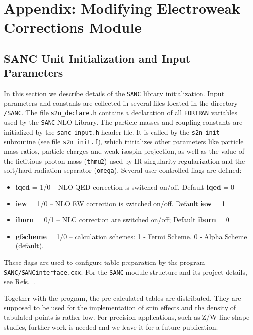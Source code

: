 \documentclass[]{Tauola_interface_design}
\begin{document}
\section{Appendix: Modifying Electroweak Corrections Module}
\label{section:SANC}

\subsection{SANC Unit Initialization and Input Parameters  }


In this section we describe details of the {\tt SANC} library initialization. Input parameters and constants are collected in several
files located in the directory {\tt /SANC}. The file {\tt  s2n\_declare.h} contains a declaration of all {\tt FORTRAN} variables used 
by the {\tt SANC} NLO Library. The particle masses and coupling constants
are initialized by the {\tt sanc\_input.h} header file. It is called by the {\tt s2n\_init} subroutine 
(see file {\tt s2n\_init.f}), which initializes other parameters like particle mass ratios,
particle charges and weak isospin projection, as well as the value of the fictitious photon mass ({\tt thmu2}) used by IR singularity 
regularization and
the soft/hard radiation separator ({\tt omega}). Several  user controlled flags are defined:
\begin{itemize}
   \item {\rm \bf iqed} = 1/0 -- NLO QED correction is switched on/off. Default {\rm \bf iqed} = 0
   \item {\rm \bf iew}  = 1/0 -- NLO EW correction is switched on/off. Default  {\rm \bf iew} = 1
   \item {\rm \bf iborn} = 0/1 -- NLO correction are switched on/off; Default {\rm \bf iborn} = 0
   \item {\rm \bf gfscheme} = 1/0 --  calculation schemes: 1 - Fermi Scheme, 0 - Alpha 
Scheme (default).
\end{itemize}
These flags are used to configure table preparation by the  program
{\tt SANC/SANCinterface.cxx}.
For the {\tt SANC} module  structure and its project details, see Refs.~\cite{Andonov:2008ga,Andonov:2004hi}. 

Together with the program, the pre-calculated tables are distributed. 
They are supposed to be used for the implementation of spin effects and the density of tabulated points is rather low. 
For precision applications, such as Z/W line shape studies, further work
is needed and we leave it for a future publication.
\end{document}
